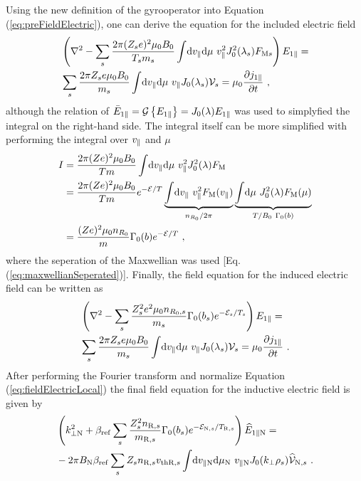 Using the new definition of the gyrooperator into Equation (\ref{eq:preFieldElectric}), one can derive the equation for the included electric field 
\begin{gather}
    \begin{aligned}
        &\left(\nabla^2 - \sum_s \frac{2\pi (Z_se)^2 \mu_0 B_0}{T_sm_s}  \int \! \mathrm{d}v_\parallel\mathrm{d}\mu ~ v_\parallel^2 J_0^2(\lambda_s) F_{\mathrm{M}s} \right) E_{1\parallel} = \\
	    &\sum_s \frac{2\pi Z_se \mu_0 B_0}{m_s}  \int \! \mathrm{d}v_\parallel\mathrm{d}\mu ~ v_\parallel J_0(\lambda_s) \mathcal{V}_s = \mu_0 \frac{\partial j_{1\parallel}}{\partial t}~,
    \end{aligned}
	\label{eq:prefieldElectricLocal}
\end{gather}
although the relation of $\bar{E}_{1\parallel} = \mathcal{G} \left\{E_{1\parallel}\right\} = J_0(\lambda) E_{1\parallel}$ was used to simplyfied the integral on the right-hand side. The integral itself can be more simplified with performing the integral over $v_\parallel$ and $\mu$
\begin{gather}
	\begin{aligned}
		I &= \frac{2\pi (Ze)^2 \mu_0 B_0}{Tm}  \int \! \mathrm{d}v_\parallel\mathrm{d}\mu ~ v_\parallel^2 J_0^2(\lambda) F_\mathrm{M} \\
		  &= \frac{2\pi (Ze)^2 \mu_0 B_0}{Tm} e^{-\mathcal{E}/T} \underbrace{\int \! \mathrm{d}v_\parallel ~ v_\parallel^2 F_\mathrm{M}(v_\parallel)}_{n_{R_0}/2\pi} \underbrace{\int \! \mathrm{d}\mu ~ J_0^2(\lambda) F_\mathrm{M}(\mu)}_{T/B_0~\Gamma_0(b)} \\
		  &= \frac{(Ze)^2 \mu_0 n_{R_0}}{m} \Gamma_0(b) e^{-\mathcal{E}/T} ~,
	\end{aligned}
\end{gather}
where the seperation of the Maxwellian was used [Eq. (\ref{eq:maxwellianSeperated})]. Finally, the field equation for the induced electric field can be written as
\begin{gather}
    \begin{aligned}
        &\left(\nabla^2 - \sum_s \frac{Z_s^2e^2 \mu_0 n_{R_0,s}}{m_s} \Gamma_0(b_s) e^{-\mathcal{E}_s/T_s} \right) E_{1\parallel} = \\
	    &\sum_s \frac{2\pi Z_se \mu_0 B_0}{m_s}  \int \! \mathrm{d}v_\parallel\mathrm{d}\mu ~ v_\parallel J_0(\lambda_s) \mathcal{V}_s = \mu_0 \frac{\partial j_{1\parallel}}{\partial t}~.
    \end{aligned}
	\label{eq:fieldElectricLocal}
\end{gather}
After performing the Fourier transform and normalize Equation (\ref{eq:fieldElectricLocal}) the final field equation for the inductive electric field is given by
\begin{gather}
    \begin{aligned}
        &\left(k_{\perp \mathrm{N}}^2 + \beta_\mathrm{ref} \sum_s \frac{Z^2_sn_{\mathrm{R},s}}{m_{\mathrm{R},s}} \Gamma_0(b_s) e^{-\mathcal{E}_{\mathrm{N},s}/T_{\mathrm{R},s}} \right) \widehat{E}_{1\parallel \mathrm{N}} = \\
        &- 2\pi B_\mathrm{N} \beta_\mathrm{ref} \sum_s Z_s n_{\mathrm{R},s} v_{\mathrm{th}\mathrm{R},s} \int \! \mathrm{d}v_{\parallel \mathrm{N}} \mathrm{d}\mu_\mathrm{N} ~ v_{\parallel \mathrm{N}} J_0(k_\perp \rho_s) \widehat{\mathcal{V}}_{\mathrm{N},s} ~.
    \end{aligned}
    \label{eq:fieldElectricLocalNorm}
\end{gather}
\newpage